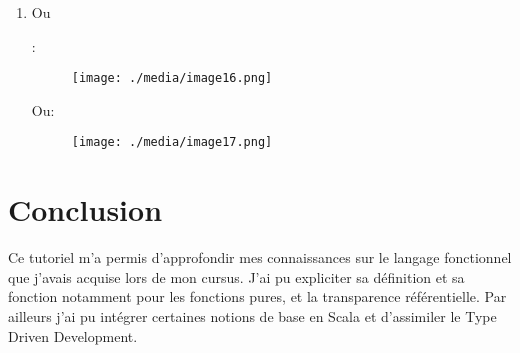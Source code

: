 \documentclass[12pt]{article}
\begin{document}
\begin{enumerate}

	\item \par

\setlength{\parskip}{0.0pt}
\begin{FlushLeft}
Ou {\fontsize{10pt}{12.0pt}\selectfont :\par}
\end{FlushLeft}\par




\begin{figure}[H]
	\begin{FlushLeft}		\texttt{[image: ./media/image16.png]}
	\end{FlushLeft}\end{figure}



\par

\begin{FlushLeft}
Ou:
\end{FlushLeft}\par




\begin{figure}[H]
	\begin{FlushLeft}		\texttt{[image: ./media/image17.png]}
	\end{FlushLeft}\end{figure}



\par

\setlength{\parskip}{8.04pt}

\end{enumerate}\section*{Conclusion }
Ce tutoriel m’a permis d’approfondir mes connaissances sur le langage fonctionnel que j’avais acquise lors de mon cursus. J’ai pu expliciter sa définition et sa fonction notamment pour les fonctions pures, et la transparence référentielle. Par ailleurs j’ai pu intégrer certaines notions de base en Scala et d’assimiler le Type Driven Development.\par
\end{document}
